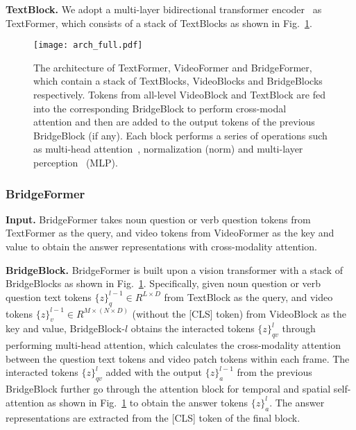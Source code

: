 \documentclass[10pt,twocolumn,letterpaper]{article}
\begin{document}
{\flushleft \bf TextBlock.} We adopt a multi-layer bidirectional transformer encoder~\cite{distilbert} as TextFormer, which consists of a stack of TextBlocks as shown in Fig.~\ref{fig:architecture}. 

\begin{figure}
	\centering
	\texttt{[image: arch\_full.pdf]}
	\caption{The architecture of TextFormer, VideoFormer and BridgeFormer, which contain a stack of TextBlocks,
	VideoBlocks and BridgeBlocks respectively. Tokens from all-level VideoBlock and TextBlock are fed into the corresponding
	BridgeBlock to perform cross-modal attention and then are added to the output tokens of the previous BridgeBlock (if any). Each block performs a series of operations such as multi-head attention~\cite{vit}, normalization (norm) and multi-layer perception~\cite{bert} (MLP).}
	\vspace{-4mm}	
	\label{fig:architecture}
\end{figure}

\subsubsection{BridgeFormer}
{\flushleft \bf Input.} BridgeFormer takes noun question or verb question tokens from TextFormer as the query, and video tokens from VideoFormer as the key and value to obtain the answer representations with cross-modality attention.

{\flushleft \bf BridgeBlock.} BridgeFormer is built upon a vision transformer with a stack of BridgeBlocks as shown in Fig.~\ref{fig:architecture}. Specifically, given noun question or verb question text tokens $\{z\}_q^{l-1}\in R^{L\times D}$ from TextBlock as the query, and video tokens $\{z\}_v^{l-1}\in R^{M\times (N\times D)}$ (without the [CLS] token) from VideoBlock as the key and value, BridgeBlock-$l$ obtains the interacted tokens $\{z\}_{qv}^l$ through performing multi-head attention, which calculates the cross-modality attention between the question text tokens and video patch tokens within each frame. The interacted tokens $\{z\}_{qv}^l$ added with the output $\{z\}_a^{l-1}$ from the previous BridgeBlock further go through the attention block for temporal and spatial self-attention as shown in Fig.~\ref{fig:architecture} to obtain the answer tokens $\{z\}_a^l$. The answer representations are extracted from the [CLS] token of the final block.
\end{document}
